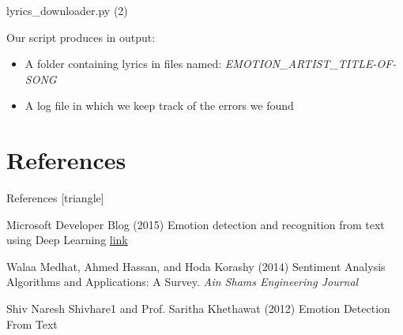 \documentclass[xcolor=dvipsnames]{beamer}
\begin{document}
\begin{frame}{lyrics\_downloader.py (2)}

Our script produces in output:
\begin{itemize}
\item A folder containing lyrics in files named: \textit{EMOTION\_ARTIST\_TITLE-OF-SONG}
\item A log file in which we keep track of the errors we found
\end{itemize}

\end{frame}


\section{References}
\begin{frame}{References}
[triangle]
 \begin{thebibliography}{99} %
 Microsoft Developer Blog (2015)
\newblock Emotion detection and recognition from text using Deep Learning
\newblock \href{https://www.microsoft.com/developerblog/2015/11/29/emotion-detection-and-recognition-from-text-using-deep-learning/}{link}

 Walaa Medhat, Ahmed Hassan, and Hoda Korashy (2014)
\newblock Sentiment Analysis Algorithms and Applications: A Survey.
\newblock \emph{Ain Shams Engineering Journal}

 Shiv Naresh Shivhare1 and Prof. Saritha Khethawat (2012)
\newblock Emotion Detection From Text

\end{thebibliography}

\end{frame}
\end{document}
